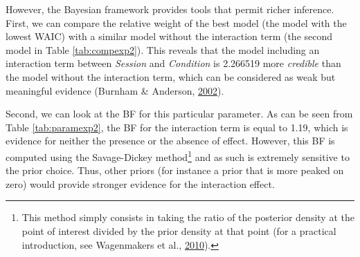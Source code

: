 \documentclass[a4paper,12pt,twoside,openright,oldfontcommands]{memoir}
\let\rmarkdownfootnote\footnote%
\def\footnote{\protect\rmarkdownfootnote}
\begin{document}
However, the Bayesian framework provides tools that permit richer inference. First, we can compare the relative weight of the best model (the model with the lowest WAIC) with a similar model without the interaction term (the second model in Table \ref{tab:compexp2}). This reveals that the model including an interaction term between \emph{Session} and \emph{Condition} is 2.266519 more \emph{credible} than the model without the interaction term, which can be considered as weak but meaningful evidence (Burnham \& Anderson, \protect\hyperlink{ref-burnham_model_2002}{2002}).

Second, we can look at the BF for this particular parameter. As can be seen from Table \ref{tab:paramexp2}, the BF for the interaction term is equal to 1.19, which is evidence for neither the presence or the absence of effect. However, this BF is computed using the Savage-Dickey method\footnote{This method simply consists in taking the ratio of the posterior density at the point of interest divided by the prior density at that point (for a practical introduction, see Wagenmakers et al., \protect\hyperlink{ref-wagenmakers_bayesian_2010}{2010}).} and as such is extremely sensitive to the prior choice. Thus, other priors (for instance a prior that is more peaked on zero) would provide stronger evidence for the interaction effect.
\end{document}
